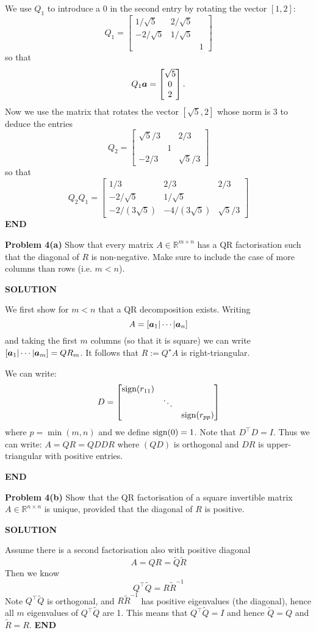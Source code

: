 \documentclass[12pt,a4paper]{article}
\def\bbR{ {\mathbb R} }
\def\a{ {\vc a} }
\def\Qt{ {\tilde Q} }
\def\Rt{ {\tilde R} }
\begin{document}
We use $Q_1$ to introduce a 0 in the second entry by rotating the vector $[1,2]$:
\[
Q_1 =  \begin{bmatrix} 1/\sqrt{5}  & 2/\sqrt{5} \\ -2/\sqrt{5} & 1/\sqrt{5} \\ && 1 \end{bmatrix}
\]
so that
\[
Q_1 \ensuremath{\bm{\a}} = \begin{bmatrix} \sqrt{5} \\ 0 \\ 2 \end{bmatrix}.
\]
Now we use the matrix that rotates the vector $[\sqrt{5},2]$ whose norm is $3$ to deduce the entries
\[
Q_2 = \begin{bmatrix} \sqrt{5}/3 & & 2/3  \\ & 1 \\
-2/3  & & \sqrt{5}/3  \end{bmatrix}
\]
so that
\[
Q_2 Q_1 = \begin{bmatrix} 1/3 & 2/3 & 2/3 \\ 
 -2/\sqrt{5} & 1/\sqrt{5} & \\ 
 -2/(3\sqrt{5}) & -4/(3\sqrt{5}) & \sqrt{5}/3
 \end{bmatrix}
\]
\textbf{END}

\textbf{Problem 4(a)} Show that every matrix $A \ensuremath{\in} \ensuremath{\bbR}^{m \ensuremath{\times} n}$ has a  QR factorisation such that the diagonal of $R$ is non-negative. Make sure to include the case of more columns than rows (i.e. $m < n$). 

\textbf{SOLUTION}

We first show for $m < n$ that a QR decomposition exists. Writing
\[
A = [\ensuremath{\bm{\a}}_1 | \ensuremath{\cdots} | \ensuremath{\bm{\a}}_n]
\]
and taking the first $m$ columns (so that it is square) we can write $[\ensuremath{\bm{\a}}_1 | \ensuremath{\cdots} | \ensuremath{\bm{\a}}_m] = Q R_m$. It follows that $R := Q^\ensuremath{\star} A$ is right-triangular.

We can write:
\[
D = \begin{bmatrix} \hbox{sign}(r_{11}) \\ & \ensuremath{\ddots}  \\ && \hbox{sign}(r_{pp}) \end{bmatrix}
\]
where $p = \min(m,n)$ and we define $\hbox{sign}(0) = 1$. Note that $D^\ensuremath{\top} D = I$. Thus we can write: $A = Q R = Q D D R$ where $(QD)$ is orthogonal and $DR$ is upper-triangular with positive entries.

\textbf{END}

\textbf{Problem 4(b)} Show that the QR factorisation of a square invertible matrix $A \ensuremath{\in} \ensuremath{\bbR}^{n \ensuremath{\times} n}$ is unique, provided that the diagonal of $R$ is positive.

\textbf{SOLUTION}

Assume there is a second factorisation also with positive diagonal
\[
A = QR = \Qt  \Rt
\]
Then we know
\[
Q^\ensuremath{\top} \Qt  = R \Rt^{-1}
\]
Note $Q^\ensuremath{\top} \Qt $ is orthogonal, and $R \Rt^{-1}$ has positive eigenvalues (the diagonal), hence all $m$ eigenvalues of $Q^\ensuremath{\top} \Qt $ are 1. This means that $Q^\ensuremath{\top} \Qt  = I$ and hence $\Qt = Q$ and $\Rt = R$. \textbf{END}
\end{document}
